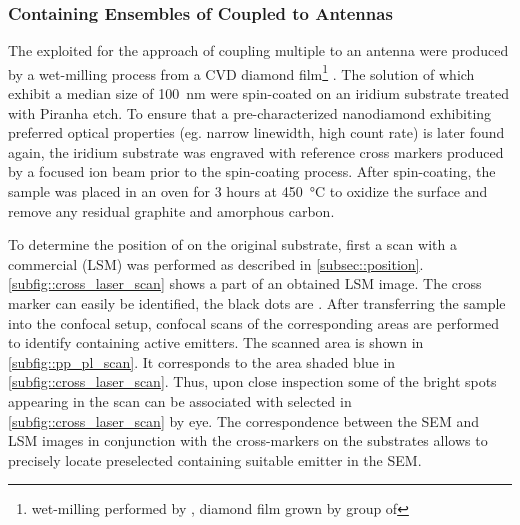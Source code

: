 		\subsubsection{\Nds Containing Ensembles of \sivs Coupled to Antennas}\label{subsubsection::antenna_multiple_sivs}

			The \nds exploited for the approach of coupling multiple \sivs to an antenna were produced by a wet-milling process from a CVD diamond film\footnote{wet-milling performed by \muzha, diamond film grown by group of \williams} .
			The solution of \nds which exhibit a median size of \SI{100}{nm} were spin-coated on an iridium substrate treated with Piranha etch.
			To ensure that a pre-characterized nanodiamond exhibiting preferred optical properties (eg. narrow linewidth, high count rate) is later found again, the iridium substrate was engraved with reference cross markers produced by a focused ion beam prior to the spin-coating process.
			After spin-coating, the sample was placed in an oven for 3 hours at \SI{450}{\celsius} to oxidize the surface and remove any residual graphite and amorphous carbon.

			To determine the position of \nds on the original substrate, first a scan with a commercial \lsm (LSM) was performed as described in \autoref{subsec::position}.
			\autoref{subfig::cross_laser_scan} shows a part of an obtained LSM image.
			The cross marker can easily be identified, the black dots are \nds.
			After transferring the sample into the confocal setup, confocal \fl scans of the corresponding areas are performed to identify \nds containing active emitters.
			The scanned area is shown in \autoref{subfig::pp_pl_scan}. It corresponds to the area shaded blue in \autoref{subfig::cross_laser_scan}. Thus, upon close inspection some of the bright spots appearing in the \fl scan can be associated with selected \nds in \autoref{subfig::cross_laser_scan} by eye. The correspondence between the SEM and LSM images in conjunction with the cross-markers on the substrates allows to precisely locate preselected \nds containing suitable emitter in the SEM.

